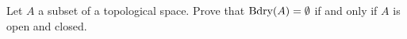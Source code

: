 \begin{comment}

\ExerciseSolution Let $A$ be a subset of a topological space $X$. To prove that $\overline{A} = A \cup \Bdry(A)$ we demonstrate the containment in both directions. Let $x \in \overline{A}$. Then $x \in A$ or $x \in A'$. We consider the cases.
\begin{itemize}
\item Suppose that $x \in A$. Then $x \in A \cup \Bdry{A}$ and we are done.
\item Suppose $x \notin A$ and $x \in A'$. We show that $x \in \Bdry(A)$. Let $N$ be a neighborhood of $x$. Since $x \in A'$, we know that $N$ contains a point in $A$ different than $x$. But $x \notin A$, so $N$ contains a point in $A$ and a point not in $A$. Thus, $x \in \Bdry(A) \subseteq A \cup \Bdry(A)$. 
\end{itemize}
In either case we have $x \in A \cup \Bdry(A)$ and so $\overline{A} \subseteq A \cup \Bdry(A)$. 

For the reverse containment, let $x \in A \cup \Bdry(A)$. Then $x \in A$ or $x \in \Bdry(A)$. We consider the cases.
\begin{itemize}
\item Suppose that $x \in A$. Then $x \in A \cup A'$ and we are done.
\item Suppose $x \notin A$ and $x \in \Bdry(A)$. We show that $x \in A'$. Let $N$ be a neighborhood of $x$. Since $x \in \Bdry(A)$, we know that $N$ contains a point in $A$ and a point in $X \setminus A$. But $x \notin A$, so $N$ contains a point in $A$ different from $x$. Thus, $x \in A' \subseteq \overline{A}$. 
\end{itemize}
In either case we have $x \in \overline{A}$ and so $A \cup \Bdry(A) \subseteq \overline{A}$. Combining the containments gives us $A \cup \Bdry(A) =\overline{A}$.

\end{comment}

\item Let $A$ a subset of a topological space. Prove that $\text{Bdry}(A) = \emptyset$ if and only if $A$ is open and closed.

